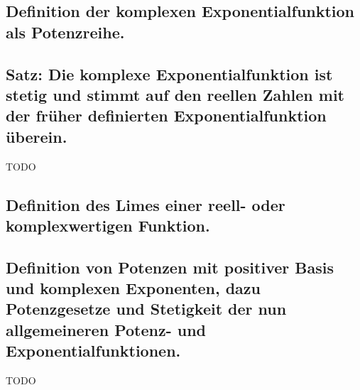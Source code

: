 \subsection{Definition der komplexen Exponentialfunktion als Potenzreihe.}

\subsection{Satz: Die komplexe Exponentialfunktion ist stetig und stimmt auf den reellen Zahlen mit der früher definierten Exponentialfunktion überein.} 
TODO
\subsection{Definition des Limes einer reell- oder komplexwertigen Funktion.}

\subsection{Definition von Potenzen mit positiver Basis und komplexen Exponenten, dazu Potenzgesetze und Stetigkeit der nun allgemeineren Potenz- und Exponentialfunktionen.}

TODO